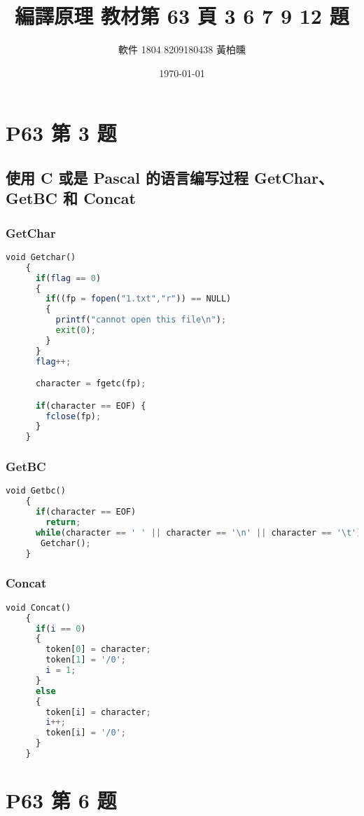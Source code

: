 \documentclass[12pt, a4paper]{article}
\author{軟件 1804 8209180438 黃柏曛}
\date{\today}
\title{編譯原理 教材第 63 頁 3 6 7 9 12 題}
\begin{document}
\maketitle
\section{P63 第 3 题}
    \subsection{使用 C 或是 Pascal 的语言编写过程 GetChar、GetBC 和 Concat}

    \subsubsection{GetChar}
    \begin{lstlisting}[language=Octave]
    void Getchar() 
    {
      if(flag == 0)
      {
        if((fp = fopen("1.txt","r")) == NULL)
        {
          printf("cannot open this file\n");
          exit(0);
        }
      }
      flag++;

      character = fgetc(fp);

      if(character == EOF) {
        fclose(fp);
      }
    }
    \end{lstlisting}
    \subsubsection{GetBC}
    \begin{lstlisting}[language=Octave]
    void Getbc()
    {
      if(character == EOF)
        return;
      while(character == ' ' || character == '\n' || character == '\t')
       Getchar();
    }
    \end{lstlisting}

    \subsubsection{Concat}
    \begin{lstlisting}[language=Octave]
    void Concat()
    {
      if(i == 0)
      {
        token[0] = character;
        token[1] = '/0';
        i = 1;
      }
      else
      {
        token[i] = character;
        i++;
        token[i] = '/0';
      }
    }
    \end{lstlisting}
    
\section{P63 第 6 题}
\end{document}
